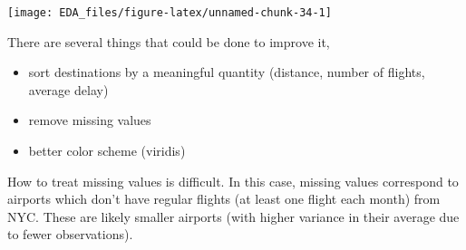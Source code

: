 \documentclass[]{book}
\newenvironment{Shaded}{\begin{snugshade}}{\end{snugshade}}
\newcommand{\DataTypeTok}[1]{\textcolor[rgb]{0.13,0.29,0.53}{#1}}
\newcommand{\KeywordTok}[1]{\textcolor[rgb]{0.13,0.29,0.53}{\textbf{#1}}}
\newcommand{\NormalTok}[1]{#1}
\newcommand{\OperatorTok}[1]{\textcolor[rgb]{0.81,0.36,0.00}{\textbf{#1}}}
\newcommand{\OtherTok}[1]{\textcolor[rgb]{0.56,0.35,0.01}{#1}}
\newcommand{\StringTok}[1]{\textcolor[rgb]{0.31,0.60,0.02}{#1}}
\providecommand{\tightlist}{%
  \setlength{\itemsep}{0pt}\setlength{\parskip}{0pt}}
\theoremstyle{plain}
\theoremstyle{remark}
\theoremstyle{definition}
\theoremstyle{definition}
\theoremstyle{definition}
\theoremstyle{remark}
\begin{document}
\begin{Shaded}
\end{Shaded}

\begin{center}\texttt{[image: EDA\_files/figure-latex/unnamed-chunk-34-1]} \end{center}

There are several things that could be done to improve it,

\begin{itemize}
\tightlist
\item
  sort destinations by a meaningful quantity (distance, number of
  flights, average delay)
\item
  remove missing values
\item
  better color scheme (viridis)
\end{itemize}

How to treat missing values is difficult. In this case, missing values
correspond to airports which don't have regular flights (at least one
flight each month) from NYC. These are likely smaller airports (with
higher variance in their average due to fewer observations).
\end{document}
